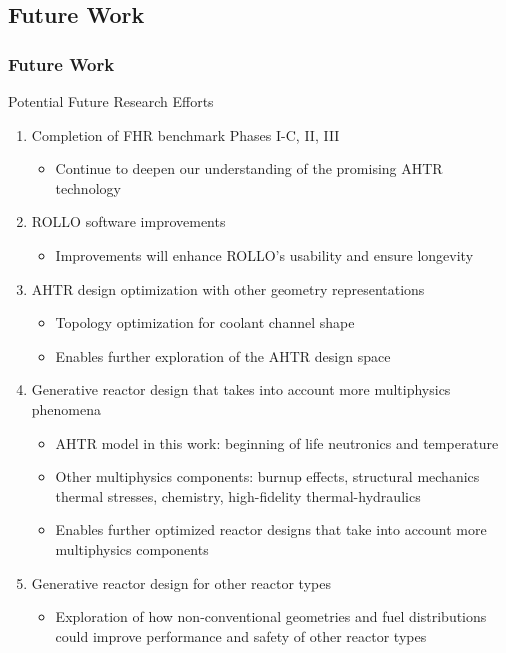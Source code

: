 \subsection{Future Work}
\begin{frame}
    \frametitle{Future Work}
    \begin{block}{Potential Future Research Efforts}
    \begin{enumerate}
        \item Completion of FHR benchmark Phases I-C, II, III
        \begin{itemize}
            \item Continue to deepen our understanding of the promising AHTR technology 
        \end{itemize}
        \item ROLLO software improvements 
            \begin{itemize}
                \item Improvements will enhance ROLLO's usability and ensure longevity
            \end{itemize}
        \item AHTR design optimization with other geometry representations 
            \begin{itemize}
                \item Topology optimization for coolant channel shape 
                \item Enables further exploration of the AHTR design space 
            \end{itemize}
        \item Generative reactor design that takes into account more multiphysics phenomena 
            \begin{itemize}
                \item AHTR model in this work: beginning of life neutronics and temperature 
                \item Other multiphysics components: burnup effects, structural mechanics 
                thermal stresses, chemistry, high-fidelity thermal-hydraulics 
                \item Enables further optimized reactor designs that take into account more 
                multiphysics components 
            \end{itemize}
        \item Generative reactor design for other reactor types
        \begin{itemize}
            \item Exploration of how non-conventional geometries and fuel distributions could 
            improve performance and safety of other reactor types 
        \end{itemize}
    \end{enumerate}
    \end{block}
\end{frame}
